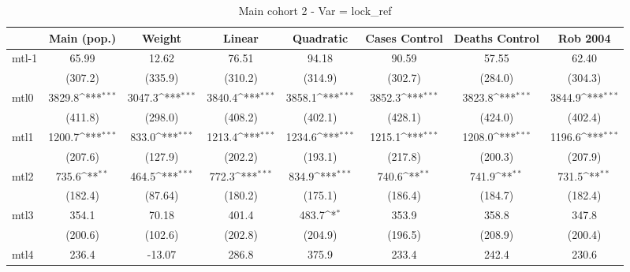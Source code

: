 \documentclass{article}
\begin{document}
{
\def\sym#1{\ifmmode^{#1}\else\(^{#1}\)\fi}
\begin{longtable}{l*{7}{c}}
\caption{Main cohort 2 - Var = lock\_ref}\\
\hline\hline\endfirsthead\hline\endhead\hline\endfoot\endlastfoot
                &\multicolumn{1}{c}{Main (pop.)}&\multicolumn{1}{c}{Weight}&\multicolumn{1}{c}{Linear}&\multicolumn{1}{c}{Quadratic}&\multicolumn{1}{c}{Cases Control}&\multicolumn{1}{c}{Deaths Control}&\multicolumn{1}{c}{Rob 2004}\\
\hline
mtl-1           &    65.99         &    12.62         &    76.51         &    94.18         &    90.59         &    57.55         &    62.40         \\
                &  (307.2)         &  (335.9)         &  (310.2)         &  (314.9)         &  (302.7)         &  (284.0)         &  (304.3)         \\
mtl0            &   3829.8\sym{***}&   3047.3\sym{***}&   3840.4\sym{***}&   3858.1\sym{***}&   3852.3\sym{***}&   3823.8\sym{***}&   3844.9\sym{***}\\
                &  (411.8)         &  (298.0)         &  (408.2)         &  (402.1)         &  (428.1)         &  (424.0)         &  (402.4)         \\
mtl1            &   1200.7\sym{***}&    833.0\sym{***}&   1213.4\sym{***}&   1234.6\sym{***}&   1215.1\sym{***}&   1208.0\sym{***}&   1196.6\sym{***}\\
                &  (207.6)         &  (127.9)         &  (202.2)         &  (193.1)         &  (217.8)         &  (200.3)         &  (207.9)         \\
mtl2            &    735.6\sym{**} &    464.5\sym{***}&    772.3\sym{***}&    834.9\sym{***}&    740.6\sym{**} &    741.9\sym{**} &    731.5\sym{**} \\
                &  (182.4)         &  (87.64)         &  (180.2)         &  (175.1)         &  (186.4)         &  (184.7)         &  (182.4)         \\
mtl3            &    354.1         &    70.18         &    401.4         &    483.7\sym{*}  &    353.9         &    358.8         &    347.8         \\
                &  (200.6)         &  (102.6)         &  (202.8)         &  (204.9)         &  (196.5)         &  (208.9)         &  (200.4)         \\
mtl4            &    236.4         &   -13.07         &    286.8         &    375.9         &    233.4         &    242.4         &    230.6         \\

\end{longtable}}
\end{document}
